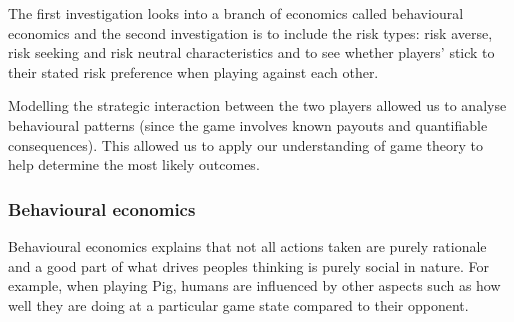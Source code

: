 \documentclass[a4paper,titlepage]{article}
\begin{document}
The first investigation looks into a branch of economics called behavioural economics and the second investigation is to include the risk types: risk averse, risk seeking and risk neutral characteristics and to see whether players' stick to their stated risk preference when playing against each other.

Modelling the strategic interaction between the two players allowed us to analyse behavioural patterns (since the game involves known payouts and quantifiable consequences). This allowed us to apply our understanding of game theory to help determine the most likely outcomes.

\subsubsection{Behavioural economics}
Behavioural economics explains that not all actions taken are purely rationale and a good part of what drives peoples thinking is purely social in nature. For example, when playing Pig, humans are influenced by other aspects such as how well they are doing at a particular game state compared to their opponent.
\end{document}
